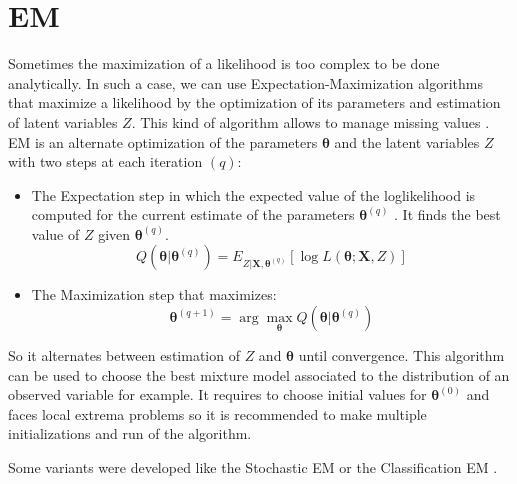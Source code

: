 \documentclass[12pt,a4paper]{report}
\begin{document}
		\section{EM}
			Sometimes the maximization of a likelihood is too complex to be done analytically. In such a case, we can use Expectation-Maximization algorithms \cite{mclachlan2007algorithm} that maximize a likelihood by the optimization of its parameters and estimation of latent variables $Z$. This kind of algorithm allows to manage missing values \cite{dempster1977maximum}. \\
EM is an alternate optimization of the parameters $\boldsymbol{\theta}$ and the latent variables $Z$ with two steps at each iteration $(q)$:
\begin{itemize}
	\item The Expectation step in which the expected value of the loglikelihood is computed for the current estimate of the parameters $\boldsymbol{\theta}^{(q)}$ . It finds the best value of $Z$ given $\boldsymbol{\theta}^{(q)}$.
	\begin{equation}
		Q(\boldsymbol{\theta}|\boldsymbol{\theta}^{(q)})=E_{Z|\boldsymbol{X},\boldsymbol{\theta}^{(q)}} [\log L(\boldsymbol{\theta};\boldsymbol{X},Z)]
	\end{equation}
	\item The Maximization step that maximizes:
	\begin{equation}
		\boldsymbol{\theta}^{(q+1)}=\arg \max_{\boldsymbol{\theta}} Q(\boldsymbol{\theta}|\boldsymbol{\theta}^{(q)})
	\end{equation}
\end{itemize}
	So it alternates between estimation of $Z$ and $\boldsymbol{\theta}$ until convergence. This algorithm can be used to choose the best mixture model associated to the distribution of an observed variable for example.		
	It requires to choose initial values for $\boldsymbol{\theta}^{(0)}$ and faces local extrema problems so it is recommended to make multiple initializations and run of the algorithm.
			
			Some variants were developed like the Stochastic EM \cite{diebolt1996stochastic,celeux1986algorithme} or the Classification EM \cite{celeux1992classification}.
			
			
\end{document}
